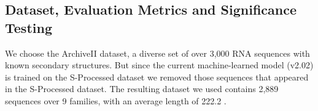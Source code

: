  

\subsection*{Dataset, Evaluation Metrics and Significance Testing}\label{dataset}
We choose the ArchiveII dataset, \cite{sloma+mathews:2016}
a diverse set of over 3,000 RNA sequences with known secondary structures.
But since the current \contrafold machine-learned model (v2.02) is trained on the S-Processed dataset \cite{andronescu+:2007}
we removed those sequences that appeared in the S-Processed dataset. 
The resulting dataset we used contains 2,889 sequences over 9 families, with an average length of 222.2 \nts. 

